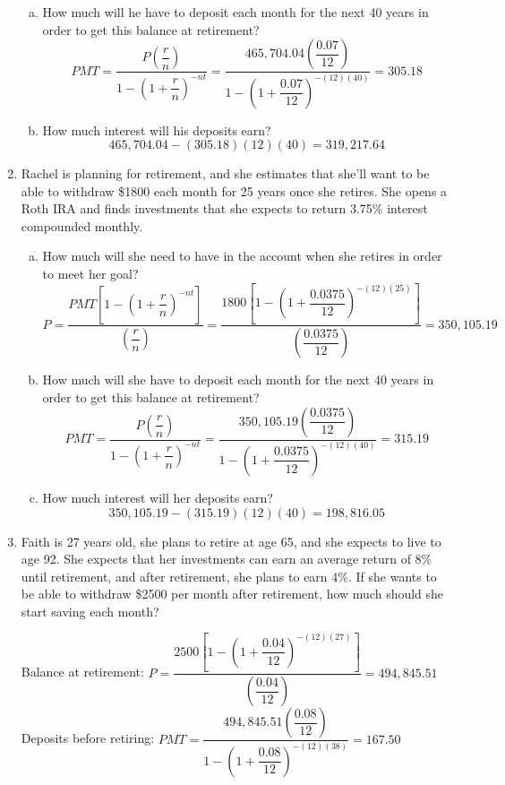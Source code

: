 \begin{enumerate}
\begin{enumerate}[(a)]
\item How much will he have to deposit each month for the next 40 years in order to get this balance at retirement? 
\[PMT = \dfrac{P\left(\dfrac{r}{n}\right)}{1-\left(1+\dfrac{r}{n}\right)^{-nt}} = \dfrac{465,704.04\left(\dfrac{0.07}{12}\right)}{1-\left(1+\dfrac{0.07}{12}\right)^{-(12)(40)}} = 305.18\]

\item How much interest will his deposits earn? 
\[465,704.04 - (305.18)(12)(40) = 319,217.64\]
\end{enumerate}

\item Rachel is planning for retirement, and she estimates that she'll want to be able to withdraw \$1800 each month for 25 years once she retires.  She opens a Roth IRA and finds investments that she expects to return 3.75\% interest compounded monthly.
\begin{enumerate}[(a)]
\item How much will she need to have in the account when she retires in order to meet her goal? 
\[P = \dfrac{PMT\left[1-\left(1+\dfrac{r}{n}\right)^{-nt}\right]}{\left(\dfrac{r}{n}\right)} = \dfrac{1800\left[1-\left(1+\dfrac{0.0375}{12}\right)^{-(12)(25)}\right]}{\left(\dfrac{0.0375}{12}\right)} = 350,105.19\]

\item How much will she have to deposit each month for the next 40 years in order to get this balance at retirement? 
\[PMT = \dfrac{P\left(\dfrac{r}{n}\right)}{1-\left(1+\dfrac{r}{n}\right)^{-nt}} = \dfrac{350,105.19\left(\dfrac{0.0375}{12}\right)}{1-\left(1+\dfrac{0.0375}{12}\right)^{-(12)(40)}} = 315.19\]

\item How much interest will her deposits earn? 
\[350,105.19 - (315.19)(12)(40) = 198,816.05\]
\end{enumerate}

\item Faith is 27 years old, she plans to retire at age 65, and she expects to live to age 92.  She expects that her investments can earn an average return of 8\% until retirement, and after retirement, she plans to earn 4\%.  If she wants to be able to withdraw \$2500 per month after retirement, how much should she start saving each month? 
\begin{center}
Balance at retirement: $P = \dfrac{2500\left[1-\left(1+\dfrac{0.04}{12}\right)^{-(12)(27)}\right]}{\left(\dfrac{0.04}{12}\right)} = 494,845.51$\\
Deposits before retiring: $PMT = \dfrac{494,845.51\left(\dfrac{0.08}{12}\right)}{1-\left(1+\dfrac{0.08}{12}\right)^{-(12)(38)}} = 167.50$
\end{center}


\end{enumerate}

